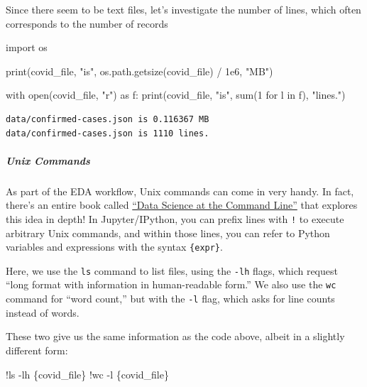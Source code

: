 \documentclass[
  letterpaper,
  DIV=11,
  numbers=noendperiod]{scrreprt}
\let\oldsubparagraph\subparagraph
\renewcommand{\subparagraph}[1]{\oldsubparagraph{#1}\mbox{}}
\newenvironment{Shaded}{\begin{snugshade}}{\end{snugshade}}
\newcommand{\BuiltInTok}[1]{\textcolor[rgb]{0.00,0.23,0.31}{#1}}
\newcommand{\ControlFlowTok}[1]{\textcolor[rgb]{0.00,0.23,0.31}{#1}}
\newcommand{\DecValTok}[1]{\textcolor[rgb]{0.68,0.00,0.00}{#1}}
\newcommand{\FloatTok}[1]{\textcolor[rgb]{0.68,0.00,0.00}{#1}}
\newcommand{\ImportTok}[1]{\textcolor[rgb]{0.00,0.46,0.62}{#1}}
\newcommand{\KeywordTok}[1]{\textcolor[rgb]{0.00,0.23,0.31}{#1}}
\newcommand{\NormalTok}[1]{\textcolor[rgb]{0.00,0.23,0.31}{#1}}
\newcommand{\OperatorTok}[1]{\textcolor[rgb]{0.37,0.37,0.37}{#1}}
\newcommand{\StringTok}[1]{\textcolor[rgb]{0.13,0.47,0.30}{#1}}
\begin{document}
Since there seem to be text files, let's investigate the number of
lines, which often corresponds to the number of records

\begin{Shaded}
\begin{Highlighting}[]
\ImportTok{import}\NormalTok{ os}

\BuiltInTok{print}\NormalTok{(covid\_file, }\StringTok{"is"}\NormalTok{, os.path.getsize(covid\_file) }\OperatorTok{/} \FloatTok{1e6}\NormalTok{, }\StringTok{"MB"}\NormalTok{)}

\ControlFlowTok{with} \BuiltInTok{open}\NormalTok{(covid\_file, }\StringTok{"r"}\NormalTok{) }\ImportTok{as}\NormalTok{ f:}
    \BuiltInTok{print}\NormalTok{(covid\_file, }\StringTok{"is"}\NormalTok{, }\BuiltInTok{sum}\NormalTok{(}\DecValTok{1} \ControlFlowTok{for}\NormalTok{ l }\KeywordTok{in}\NormalTok{ f), }\StringTok{"lines."}\NormalTok{)}
\end{Highlighting}
\end{Shaded}

\begin{verbatim}
data/confirmed-cases.json is 0.116367 MB
data/confirmed-cases.json is 1110 lines.
\end{verbatim}

\hypertarget{unix-commands}{%
\subparagraph{Unix Commands}\label{unix-commands}}

As part of the EDA workflow, Unix commands can come in very handy. In
fact, there's an entire book called
\href{https://datascienceatthecommandline.com/}{``Data Science at the
Command Line''} that explores this idea in depth! In Jupyter/IPython,
you can prefix lines with \texttt{!} to execute arbitrary Unix commands,
and within those lines, you can refer to Python variables and
expressions with the syntax \texttt{\{expr\}}.

Here, we use the \texttt{ls} command to list files, using the
\texttt{-lh} flags, which request ``long format with information in
human-readable form.'' We also use the \texttt{wc} command for ``word
count,'' but with the \texttt{-l} flag, which asks for line counts
instead of words.

These two give us the same information as the code above, albeit in a
slightly different form:

\begin{Shaded}
\begin{Highlighting}[]
\OperatorTok{!}\NormalTok{ls }\OperatorTok{{-}}\NormalTok{lh \{covid\_file\}}
\OperatorTok{!}\NormalTok{wc }\OperatorTok{{-}}\NormalTok{l \{covid\_file\}}
\end{Highlighting}
\end{Shaded}
\end{document}
